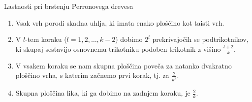 \documentclass{beamer}
\begin{document}
\begin{frame}{Lastnosti pri brstenju Perronovega drevesa}
    \begin{enumerate}
        \item Vsak vrh porodi skadna uhlja, ki imata enako ploščino kot taisti vrh.
        \pause \item V $ l $-tem koraku ($ l = 1, 2, \ldots, k-2 $) dobimo $ 2^l $ prekrivajočih se podtrikotnikov, ki skupaj sestavijo osnovnemu trikotniku podoben trikotnik z višino $ \frac{l+2}{k} $.
        \pause \item V vsakem koraku se nam skupna ploščina poveča za natanko dvakratno ploščino vrha, s katerim začnemo prvi korak, tj. za $ \frac{2}{k^2} $.
        \pause \item Skupna ploščina lika, ki ga dobimo na zadnjem koraku, je $ \frac{2}{k} $.
    \end{enumerate}
\end{frame}

\end{document}
